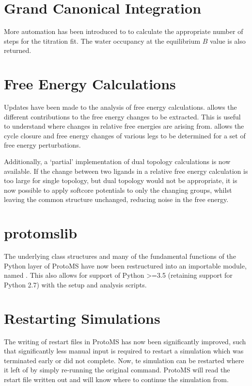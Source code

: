 \documentclass[letterpaper,10pt,english]{sphinxmanual}
\begin{document}
\section{Grand Canonical Integration}
\label{\detokenize{changelog:grand-canonical-integration}}
More automation has been introduced to  to calculate the appropriate number of steps for the titration fit. The water occupancy at the equilibrium \(B\) value is also returned.


\section{Free Energy Calculations}
\label{\detokenize{changelog:free-energy-calculations}}
Updates have been made to the analysis of free energy calculations.  allows the different contributions to the free energy changes to be extracted. This is useful to understand where changes in relative free energies are arising from.  allows the cycle closure and free energy changes of various legs to be determined for a set of free energy perturbations.

Additionally, a ‘partial’ implementation of dual topology calculations is now available. If the change between two ligands in a relative free energy calculation is too large for single topology, but dual topology would not be appropriate, it is now possible to apply softcore potentials to only the changing groups, whilst leaving the common structure unchanged, reducing noise in the free energy.


\section{protomslib}
\label{\detokenize{changelog:protomslib}}
The underlying class structures and many of the fundamental functions of the Python layer of ProtoMS have now been restructured into an importable module, named . This also allows for support of Python \textgreater{}=3.5 (retaining support for Python 2.7) with the setup and analysis scripts.


\section{Restarting Simulations}
\label{\detokenize{changelog:restarting-simulations}}
The writing of restart files in ProtoMS has now been significantly improved, such that significantly less manual input is required to restart a simulation which was terminated early or did not complete. Now, te simulation can be restarted where it left of by simply re-running the original command. ProtoMS will read the rstart file written out and will know where to continue the simulation from.
\end{document}
